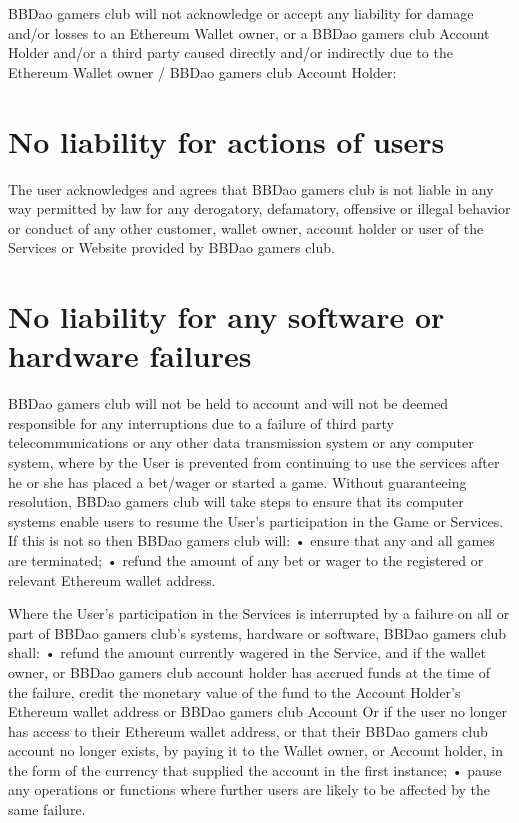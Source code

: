 \documentclass[
]{book}
\begin{document}
BBDao gamers club will not acknowledge or accept any liability for damage and/or losses to an Ethereum Wallet owner, or a BBDao gamers club Account Holder and/or a third party caused directly and/or indirectly due to the Ethereum Wallet owner / BBDao gamers club Account Holder:

\hypertarget{no-liability-for-actions-of-users}{%
\section{No liability for actions of users}\label{no-liability-for-actions-of-users}}

The user acknowledges and agrees that BBDao gamers club is not liable in any way permitted by law for any derogatory, defamatory, offensive or illegal behavior or conduct of any other customer, wallet owner, account holder or user of the Services or Website provided by BBDao gamers club.

\hypertarget{no-liability-for-any-software-or-hardware-failures}{%
\section{No liability for any software or hardware failures}\label{no-liability-for-any-software-or-hardware-failures}}

BBDao gamers club will not be held to account and will not be deemed responsible for any interruptions due to a failure of third party telecommunications or any other data transmission system or any computer system, where by the User is prevented from continuing to use the services after he or she has placed a bet/wager or started a game.
Without guaranteeing resolution, BBDao gamers club will take steps to ensure that its computer systems enable users to resume the User's participation in the Game or Services. If this is not so then BBDao gamers club will:
• ensure that any and all games are terminated;
• refund the amount of any bet or wager to the registered or relevant Ethereum wallet address.

Where the User's participation in the Services is interrupted by a failure on all or part of BBDao gamers club's systems, hardware or software, BBDao gamers club shall:
• refund the amount currently wagered in the Service, and if the wallet owner, or BBDao gamers club account holder has accrued funds at the time of the failure, credit the monetary value of the fund to the Account Holder's Ethereum wallet address or BBDao gamers club Account Or if the user no longer has access to their Ethereum wallet address, or that their BBDao gamers club account no longer exists, by paying it to the Wallet owner, or Account holder, in the form of the currency that supplied the account in the first instance;
• pause any operations or functions where further users are likely to be affected by the same failure.
\end{document}
